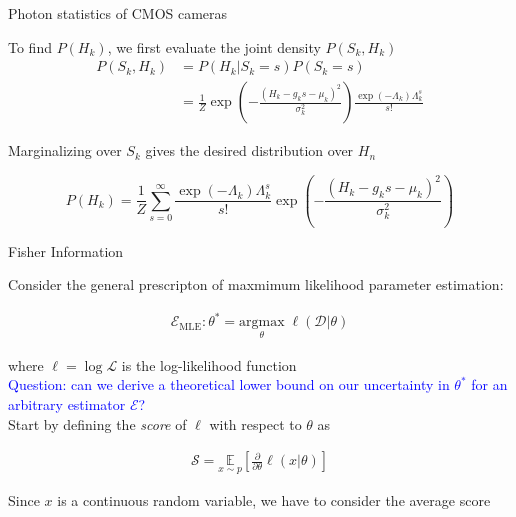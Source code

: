 \documentclass[aspectratio=1610]{beamer}					%
\begin{document}
\begin{frame}{Photon statistics of CMOS cameras}

To find $P(H_{k})$, we first evaluate the joint density $P(S_{k},H_{k})$
\vspace{0.1in}
\begin{align*}
P(S_{k},H_{k}) &= P(H_{k}|S_{k}=s)P(S_{k}=s)\\
&= \frac{1}{Z}\exp\left(-\frac{(H_{k}-g_{k}s-\mu_{k})^{2}}{\sigma_{k}^{2}}\right)\frac{\exp\left({-\Lambda_{k}}\right)\Lambda_{k}^{s}}{s!}
\end{align*}
\vspace{0.1in}

Marginalizing over $S_{k}$ gives the desired distribution over $H_{n}$

\begin{equation*}
P(H_{k}) = \frac{1}{Z}\sum_{s=0}^{\infty}\frac{\exp\left({-\Lambda_{k}}\right)\Lambda_{k}^{s}}{s!}\exp\left(-\frac{(H_{k}-g_{k}s-\mu_{k})^{2}}{\sigma_{k}^{2}}\right)
\end{equation*}

\end{frame}



\begin{frame}{Fisher Information}

Consider the general prescripton of maxmimum likelihood parameter estimation:

\begin{align*}
\mathcal{E}_{\mathrm{MLE}}: \theta^{*} = \underset{\theta}{\mathrm{argmax}}\; \ell(\mathcal{D}|\theta)
\end{align*}

where $\ell = \log\mathcal{L}$ is the log-likelihood function\\
\vspace{0.1in}
\textcolor{blue}{Question: can we derive a theoretical lower bound on our uncertainty in $\theta^{*}$ for an arbitrary estimator $\mathcal{E}$?}\\
\vspace{0.1in}
Start by defining the \emph{score} of $\ell$ with respect to $\theta$ as

\begin{align*}
\mathcal{S} = \underset{{x\sim p}}{\mathbb{E}}\left[\frac{\partial}{\partial\theta} \ell(x|\theta)\right]
\end{align*}

Since $x$ is a continuous random variable, we have to consider the average score

\end{frame}
\end{document}
